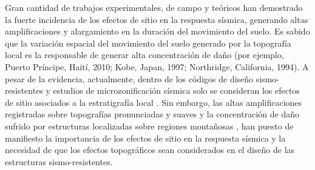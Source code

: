 \documentclass[spanish,letterpaper,12pt,twoside,openany]{article}
\begin{document}
%
%
Gran cantidad de trabajos experimentales, de campo y teóricos han demostrado la fuerte incidencia de los efectos de sitio en la respuesta sísmica, generando altas  amplificaciones y alargamiento en la duración del movimiento del suelo. Es sabido que la variación espacial del movimiento del suelo generado por la topografía local es la responsable de generar alta concentración de daño (por ejemplo, Puerto Príncipe, Haití, 2010; Kobe, Japan, 1997; Northridge, California, 1994). A pesar de la evidencia, actualmente, dentro de los códigos de diseño sismo-resistentes y estudios de microzonificación sísmica solo se consideran los efectos de sitio asociados a la estratigrafía local \citep{Kaklamanos2015, Idriss1992user, Schnabel1972shake}. Sin embargo, las altas amplificaciones registradas sobre topografías pronunciadas y suaves \citep{spudich1996directional, Griffiths1979} y la concentración de daño sufrido por estructuras localizadas sobre regiones montañosas \citep{assimaki2005soil, assimaki2005effects, Hough2011, Assimaki2013}, han puesto de manifiesto la importancia de los efectos de sitio en la respuesta sísmica y la necesidad de que los efectos topográficos sean considerados en el diseño de las estructuras sismo-resistentes.
\end{document}
